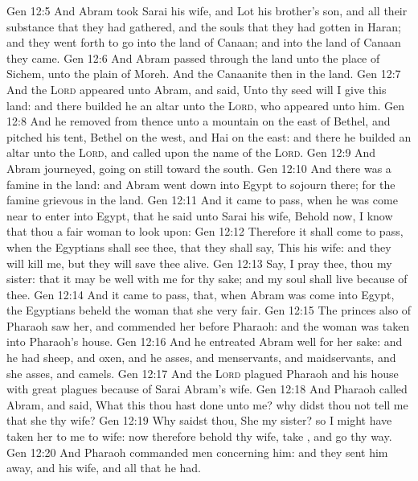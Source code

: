 \vs Gen 12:5 And Abram took Sarai his wife, and Lot his brother's son, and all their substance that they had gathered, and the souls that they had gotten in Haran; and they went forth to go into the land of Canaan; and into the land of Canaan they came.
\vs Gen 12:6 And Abram passed through the land unto the place of Sichem, unto the plain of Moreh. And the Canaanite  then in the land.
\vs Gen 12:7 And the \textsc{Lord} appeared unto Abram, and said, Unto thy seed will I give this land: and there builded he an altar unto the \textsc{Lord}, who appeared unto him.
\vs Gen 12:8 And he removed from thence unto a mountain on the east of Bethel, and pitched his tent,  Bethel on the west, and Hai on the east: and there he builded an altar unto the \textsc{Lord}, and called upon the name of the \textsc{Lord}.
\vs Gen 12:9 And Abram journeyed, going on still toward the south.
\vs Gen 12:10 And there was a famine in the land: and Abram went down into Egypt to sojourn there; for the famine  grievous in the land.
\vs Gen 12:11 And it came to pass, when he was come near to enter into Egypt, that he said unto Sarai his wife, Behold now, I know that thou  a fair woman to look upon:
\vs Gen 12:12 Therefore it shall come to pass, when the Egyptians shall see thee, that they shall say, This  his wife: and they will kill me, but they will save thee alive.
\vs Gen 12:13 Say, I pray thee, thou  my sister: that it may be well with me for thy sake; and my soul shall live because of thee.
\vs Gen 12:14 And it came to pass, that, when Abram was come into Egypt, the Egyptians beheld the woman that she  very fair.
\vs Gen 12:15 The princes also of Pharaoh saw her, and commended her before Pharaoh: and the woman was taken into Pharaoh's house.
\vs Gen 12:16 And he entreated Abram well for her sake: and he had sheep, and oxen, and he asses, and menservants, and maidservants, and she asses, and camels.
\vs Gen 12:17 And the \textsc{Lord} plagued Pharaoh and his house with great plagues because of Sarai Abram's wife.
\vs Gen 12:18 And Pharaoh called Abram, and said, What  this  thou hast done unto me? why didst thou not tell me that she  thy wife?
\vs Gen 12:19 Why saidst thou, She  my sister? so I might have taken her to me to wife: now therefore behold thy wife, take , and go thy way.
\vs Gen 12:20 And Pharaoh commanded  men concerning him: and they sent him away, and his wife, and all that he had.
